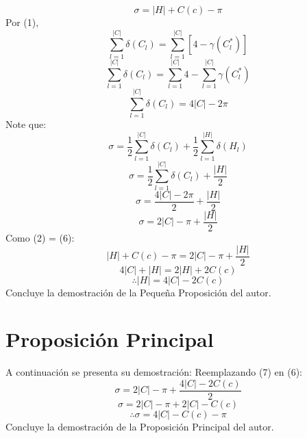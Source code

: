 \documentclass{article}
\begin{document}
\begin{equation}
\sigma=|H|+C(c)-\pi
\end{equation}Por (1),
$$\sum_{l=1}^{|C|}\delta(C_l)=\sum_{l=1}^{|C|}\left[4-\gamma(C^*_l)\right]$$
$$\sum_{l=1}^{|C|}\delta(C_l)=\sum_{l=1}^{|C|}4-\sum_{l=1}^{|C|}\gamma(C^*_l)$$
\begin{equation}
\sum_{l=1}^{|C|}\delta(C_l)=4|C|-2\pi
\end{equation}Note que:
$$\sigma=\frac{1}{2}\sum_{l=1}^{|C|}\delta(C_l)+\frac{1}{2}\sum_{l=1}^{|H|}\delta(H_l)$$
$$\sigma=\frac{1}{2}\sum_{l=1}^{|C|}\delta(C_l)+\frac{|H|}{2}$$
$$\sigma=\frac{4|C|-2\pi}{2}+\frac{|H|}{2}$$
\begin{equation}
\sigma=2|C|-\pi+\frac{|H|}{2}
\end{equation}Como (2) = (6):\newline
$$|H|+C(c)-\pi=2|C|-\pi+\frac{|H|}{2}$$
$$4|C|+|H|=2|H|+2C(c)$$
\begin{equation}
\therefore|H|=4|C|-2C(c)
\end{equation}\newline Concluye la demostración de la Pequeña Proposición del autor.

\section{Proposición Principal}
\newtheorem{myteo3}{Teorema} 
\begin{center} 
\end{center}A continuación se presenta su demostración:\newline\newline
Reemplazando (7) en (6):\newline
$$\sigma=2|C|-\pi+\frac{4|C|-2C(c)}{2}$$
$$\sigma=2|C|-\pi+2|C|-C(c)$$
\begin{equation}
\therefore\sigma=4|C|-C(c)-\pi
\end{equation} \newline Concluye la demostración de la Proposición Principal del autor.
\end{document}
